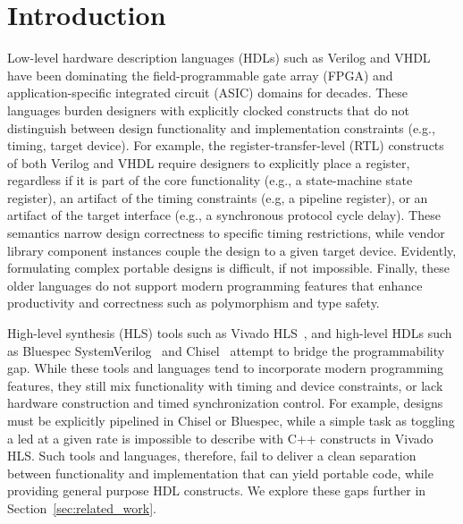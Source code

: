 \section{Introduction}



Low-level hardware description languages (HDLs) such as Verilog and VHDL have been dominating the field-programmable gate array (FPGA) and application-specific integrated circuit (ASIC) domains for decades.
These languages burden designers with explicitly clocked constructs that do not distinguish between design functionality and implementation constraints (e.g., timing, target device).
For example, the register-transfer-level (RTL) constructs of both Verilog and VHDL require designers to explicitly place a register, regardless if it is part of the core functionality (e.g., a state-machine state register), an artifact of the timing constraints (e.g, a pipeline register), or an artifact of the target interface (e.g., a synchronous protocol cycle delay).
%
These semantics narrow design correctness to specific timing restrictions, while vendor library component instances couple the design to a given target device. Evidently, formulating complex portable designs is difficult, if not impossible.
%
Finally, these older languages do not support modern programming features that enhance productivity and correctness such as polymorphism and type safety.

High-level synthesis (HLS) tools such as Vivado HLS~\cite{Vivado2012}, and high-level HDLs such as Bluespec SystemVerilog~\cite{nikhil2004bluespec} and Chisel~\cite{Bachrach2012} attempt to bridge the programmability gap.
While these tools and languages tend to incorporate modern programming features, they still mix functionality with timing and device constraints, or lack hardware construction and timed synchronization control. For example, designs must be explicitly pipelined in Chisel or Bluespec, while a simple task as toggling a led at a given rate is impossible to describe with C++ constructs in Vivado HLS.
Such tools and languages, therefore, fail to deliver a clean separation between functionality and implementation that can yield portable code, while providing general purpose HDL constructs. We explore these gaps further in Section~\ref{sec:related_work}.

